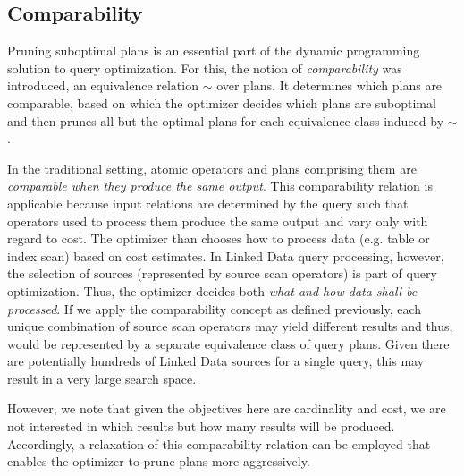 \subsection{Comparability}
\label{sec:comparability}

Pruning suboptimal plans is an essential part of the dynamic programming solution to
query optimization. 
For this, the notion of \emph{comparability} was introduced, an
equivalence relation $\sim$ over plans. It determines which plans are
comparable, based on which
the optimizer decides which plans are suboptimal and then prunes all
but the optimal plans for each equivalence class induced by $\sim$.

In the traditional setting, atomic operators and plans comprising them are \emph{comparable when they produce the same output}. This comparability relation is applicable because input relations are determined by the query such that operators used to process them produce the same output and vary only with regard to cost. The optimizer than chooses how to process data (e.g. table or index
scan) based on cost estimates. In Linked Data query processing, however, the selection of
sources (represented by source scan operators) is part of query
optimization. Thus, the optimizer decides both \emph{what and how data shall be processed}. 
If we apply the comparability concept as defined
previously, each unique combination of source scan operators may yield different results and thus, would be represented by a separate equivalence class of query plans. Given there
are potentially hundreds of Linked Data sources for a single query, this may result in a very large search space. 

However, we note that given the objectives here are cardinality and cost, we are not interested in which results but how many results will be produced. 
Accordingly, a relaxation of this comparability relation can be employed that enables the optimizer to prune plans
more aggressively.

